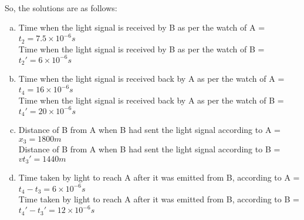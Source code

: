 \documentclass[10pt, a4paper]{article}
\begin{document}
\begin{enumerate}
\\
So, the solutions are as follows:
\begin{enumerate}[(a)]
\item Time when the light signal is received by B as per the watch of A = $t_{2} = 7.5\times10^{-6}s$\\
Time when the light signal is received by B as per the watch of B = $t_{2}' = 6\times10^{-6}s$\\
\item Time when the light signal is received back by A as per the watch of A = $t_{4} = 16\times10^{-6}s$\\
Time when the light signal is received back by A as per the watch of B = $t_{4}' = 20\times10^{-6}s$\\
\item Distance of B from A when B had sent the light signal according to A = $x_{3} = 1800m$\\
Distance of B from A when B had sent the light signal according to B = $vt_{3}' = 1440m$\\
\item Time taken by light to reach A after it was emitted from B, according to A = $t_{4}-t_{3} = 6\times10^{-6}s$\\
Time taken by light to reach A after it was emitted from B, according to B = $t_{4}'-t_{3}' = 12\times10^{-6}s$\\
\end{enumerate}
\end{enumerate}
\end{document}
